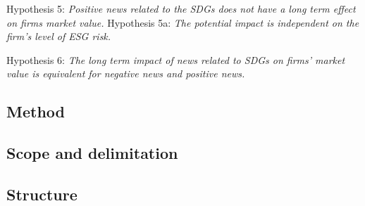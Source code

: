 Hypothesis 5: \textit{Positive news related to the SDGs does not have a long term effect on firms market value.}
Hypothesis 5a: \textit{The potential impact is independent on the firm's level of ESG risk.} 

Hypothesis 6: \textit{The long term impact of news related to SDGs on firms' market value is equivalent for negative news and positive news.}
\subsection{Method}

\subsection{Scope and delimitation}

\subsection{Structure}
